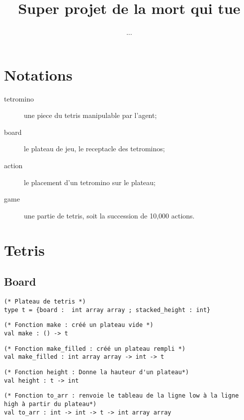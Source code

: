 \documentclass{article}
\title{Super projet de la mort qui tue}
\author{...}
\begin{document}
\maketitle
\lstset{language=Caml}

\section{Notations}
\begin{description}
  \item[tetromino] une piece du tetris manipulable par l'agent;
  \item[board] le plateau de jeu, le receptacle des tetrominos;
  \item[action] le placement d'un tetromino sur le plateau;
  \item[game] une partie de tetris, soit la succession de 10,000 actions.
\end{description}

\section{Tetris}

\subsection{Board}

\begin{lstlisting}[frame=L]
(* Plateau de tetris *)
type t = {board :  int array array ; stacked_height : int}
\end{lstlisting}

\begin{lstlisting}[frame=L]
(* Fonction make : créé un plateau vide *)
val make : () -> t
\end{lstlisting}

\begin{lstlisting}[frame=L]
(* Fonction make_filled : créé un plateau rempli *)
val make_filled : int array array -> int -> t
\end{lstlisting}

\begin{lstlisting}[frame=L]
(* Fonction height : Donne la hauteur d'un plateau*)
val height : t -> int
\end{lstlisting}

\begin{lstlisting}[frame=L]
(* Fonction to_arr : renvoie le tableau de la ligne low à la ligne high à partir du plateau*)
val to_arr : int -> int -> t -> int array array
\end{lstlisting}
\end{document}
